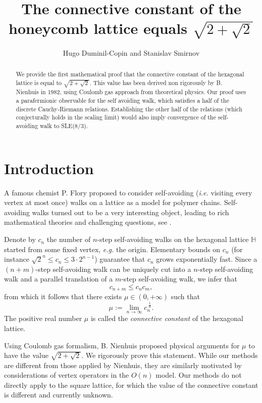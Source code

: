 \documentclass[a4paper,oneside,12pt]{article}
\title{The connective constant of the honeycomb lattice equals $\sqrt{2+\sqrt 2}$}
\author{Hugo Duminil-Copin and Stanislav Smirnov}
\date{}
\newcommand{\He}{\mathbb{H}}
\begin{document}
\maketitle

\begin{abstract}We provide the first mathematical proof that the connective constant of the hexagonal lattice is equal to $\sqrt{2+\sqrt{2}}$. This value has been derived non rigorously by B. Nienhuis in 1982, using Coulomb gas approach from theoretical physics. Our proof uses a parafermionic observable for the self avoiding walk,
which satisfies a half of the discrete Cauchy-Riemann relations.
Establishing the other half of the relations (which conjecturally holds in the scaling limit)
would also imply convergence of the self-avoiding walk to SLE($8/3$).
 \end{abstract}

\section{Introduction}
A famous chemist P. Flory \cite{Flory} proposed to consider self-avoiding (\emph{i.e.} visiting every vertex at most once) walks on a lattice as a model for polymer chains. Self-avoiding walks turned out to be a very interesting object, leading to rich mathematical theories and challenging questions, see \cite{MadrasSlade}.

Denote by $c_n$ the number of $n$-step self-avoiding walks on the hexagonal lattice $\He$ started from some fixed vertex, \emph{e.g.} the origin. Elementary bounds on $c_n$ (for instance $\sqrt{2}^n\leq c_n\leq 3\cdot 2^{n-1}$) guarantee that $c_n$ grows exponentially fast. Since a $(n+m)$-step self-avoiding walk can be uniquely cut into a $n$-step self-avoiding walk and a parallel translation of a $m$-step self-avoiding  walk, we infer that
\begin{equation*}
	c_{n+m}\leq c_nc_m,
\end{equation*}
from which it follows that there exists $\mu\in(0,+\infty)$ such that
\begin{equation*}	
	\mu:=\lim_{n\rightarrow \infty}c_n^{\ \frac 1n}.
\end{equation*}
The positive real number $\mu$ is called the \emph{connective constant} of the hexagonal lattice. 

Using Coulomb gas formalism, B. Nienhuis \cite{Nienhuis,Nienhuis-jsp} proposed physical arguments for $\mu$ to have the value $\sqrt{2+\sqrt 2}$. We rigorously prove this statement. While our methods are different from those applied by Nienhuis, they are similarly motivated by considerations of vertex operators in the $O(n)$ model.
Our methods do not directly apply to the square lattice,
for which the value of the connective constant is different and currently unknown.
\end{document}
